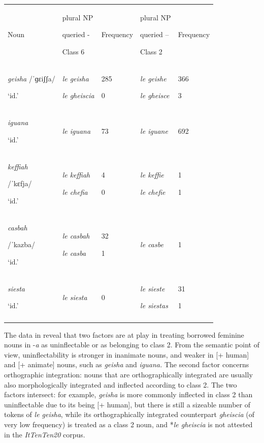 \documentclass[output=paper]{langscibook}
\begin{document}
\begin{tabularx}{\textwidth}{XXXXX}

\lsptoprule

Noun & plural NP 

queried -

Class 6 & Frequency & plural NP 

queried – 

Class 2 & Frequency\\
\textit{geisha} /ˈɡɛiʃʃa/

‘id.’ & \textit{le geisha}

\textit{le gheiscia} & 285

0 & \textit{le geishe}

\textit{le gheisce} & 366

3\\
\textit{iguana}

‘id.’ & \textit{le iguana} & 73 & \textit{le iguane} & 692\\
\textit{keffiah} 

/ˈkɛfja/

‘id.’ & \textit{le keffiah} 

\textit{le chefia}  & 4

0 & \textit{le keffie} 

\textit{le chefie} & 1

1\\
\textit{casbah}

/ˈkazba/

‘id.’ & \textit{le casbah}

\textit{le casba} & 32

1 & \textit{le casbe} & 1\\
\textit{siesta}

‘id.’ & \textit{le siesta} & 0 & \textit{le sieste}

\textit{le siestas} & 31

1\\
\lspbottomrule
\end{tabularx}
The data in  reveal that two factors are at play in treating borrowed feminine nouns in \nobreakdash-\textit{a} as uninflectable or as belonging to class 2. From the semantic point of view, uninflectability is stronger in inanimate nouns, and weaker in [+ human] and [+ animate] nouns, such as \textit{geisha} and \textit{iguana.} The second factor concerns orthographic integration: nouns that are orthographically integrated are usually also morphologically integrated and inflected according to class 2. The two factors intersect: for example, \textit{geisha} is more commonly inflected in class 2 than uninflectable due to its being [+ human], but there is still a sizeable number of tokens of \textit{le geisha}, while its orthographically integrated counterpart \textit{gheiscia} (of very low frequency) is treated as a class 2 noun, and *\textit{le gheiscia} is not attested in the \textit{ItTenTen20} corpus.
\end{document}
